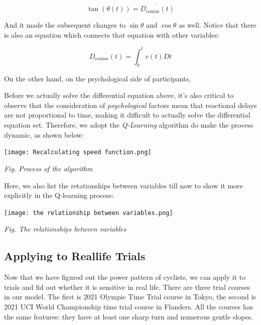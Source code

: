\documentclass{article}
\begin{document}
			\[ \tan (\theta\left(t\right)) =\dot{D_{\mathrm{course}}\left( t \right) } \]

			And it made the subsequent changes to \( \sin\theta \) and \(\cos \theta\) as well. Notice that there is also an equation which connects that equation with other variables:

			\[ D_{\mathrm{course}}\left( t \right) =\int_0^t{v\left( t \right)  D t} \]

			On the other hand, on the psychological side of participants,

			Before we actually solve the differential equation above, it's also critical to observe that the consideration of \textit{psychological} factors mean that reactional delays are not proportional to time, making it difficult to actually solve the differential equation set. Therefore, we adopt the \textit{Q-Learning} algorithm do make the process dynamic, as shown below:

			\begin{center}
				\texttt{[image: Recalculating speed function.png]}

				\small\textit{Fig. Process of the algorithm}
			\end{center}

			Here, we also list the retationships between variables till now to show it more explicitly in the Q-learning process:\

			\begin{center}
				\texttt{[image: the relationship between variables.png]}

				\small\textit{Fig. The relationships between variables}
			\end{center}


		\subsection{Applying to Reallife Trials}
		Now that we have figured out the power pattern of cyclists, we can apply it to trials and fid out whether it is sensitive in real life. There are three trial courses in our model. The first is 2021 Olympic Time Trial course in Tokyo, the second is 2021 UCI World Championship time trial course in Flanders. All the courses has the same features: they have at least one sharp turn and numerous gentle slopes.
\end{document}
